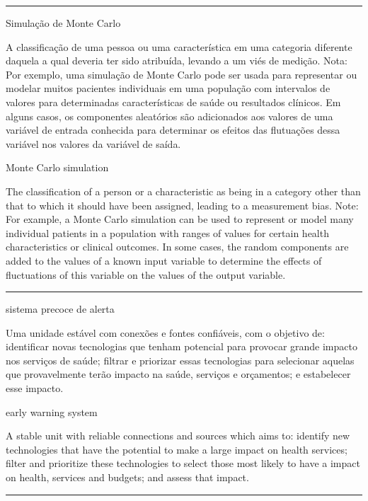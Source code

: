 \documentclass[
  openany]{book}
\begin{document}
\begin{center}\rule{0.5\linewidth}{0.5pt}\end{center}

Simulação de Monte Carlo

A classificação de uma pessoa ou uma característica em uma categoria diferente daquela a qual deveria ter sido atribuída, levando a um viés de medição. Nota: Por exemplo, uma simulação de Monte Carlo pode ser usada para representar ou modelar muitos pacientes individuais em uma população com intervalos de valores para determinadas características de saúde ou resultados clínicos. Em alguns casos, os componentes aleatórios são adicionados aos valores de uma variável de entrada conhecida para determinar os efeitos das flutuações dessa variável nos valores da variável de saída.

Monte Carlo simulation

The classification of a person or a characteristic as being in a category other than that to which it should have been assigned, leading to a measurement bias. Note: For example, a Monte Carlo simulation can be used to represent or model many individual patients in a population with ranges of values for certain health characteristics or clinical outcomes. In some cases, the random components are added to the values of a known input variable to determine the effects of fluctuations of this variable on the values of the output variable.

\begin{center}\rule{0.5\linewidth}{0.5pt}\end{center}

sistema precoce de alerta

Uma unidade estável com conexões e fontes confiáveis, com o objetivo de: identificar novas tecnologias que tenham potencial para provocar grande impacto nos serviços de saúde; filtrar e priorizar essas tecnologias para selecionar aquelas que provavelmente terão impacto na saúde, serviços e orçamentos; e estabelecer esse impacto.

early warning system

A stable unit with reliable connections and sources which aims to: identify new technologies that have the potential to make a large impact on health services; filter and prioritize these technologies to select those most likely to have a impact on health, services and budgets; and assess that impact.

\begin{center}\rule{0.5\linewidth}{0.5pt}\end{center}
\end{document}
